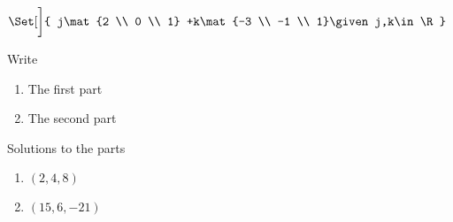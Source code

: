 \begin{exercises}
\begin{problist}
\begin{enumerate}
						$\Set[\bigg]{
							j\mat{2 \\ 0 \\ 1}
							+k\mat{-3 \\ -1 \\ 1}\given j,k\in\R
						}$
			\end{enumerate}
		\prob
		\prob
		\prob
			Write
		\prob
		\prob
		\prob
		\prob
		\prob
		\begin{enumerate}
			\item   The first part
			\item   The second part
		\end{enumerate}
	\end{problist}
	\begin{solution}
		Solutions to the parts
		\begin{enumerate}
			\item   $(2,4,8)$
			\item   $(15,6,-21)$
		\end{enumerate}
	\end{solution}
\end{exercises}
